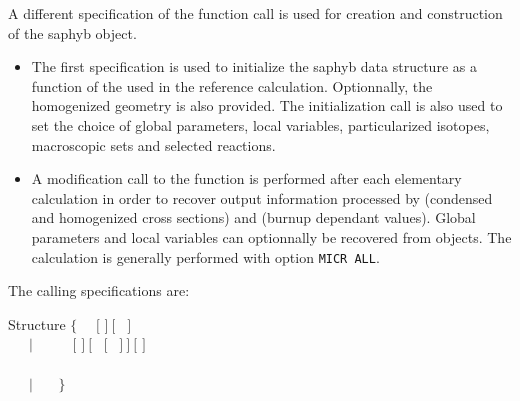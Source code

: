 A different specification of the  function call is used for
creation and construction of the {\sc saphyb} object.
\begin{itemize}
\item The first specification is used to initialize the {\sc saphyb} data structure
as a function of the  used in the reference calculation. Optionnally,
the homogenized geometry is also provided. The initialization call is also used to
set the choice of global parameters, local variables, particularized isotopes,
macroscopic sets and selected reactions.
\item A modification call to the  function is performed after each
elementary calculation in order to recover output information processed by 
(condensed and homogenized cross sections) and  (burnup dependant values).
Global parameters and local variables can optionnally be recovered from 
objects. The  calculation is generally performed with option {\tt MICR ALL}.
\end{itemize}

The calling specifications are:

\vskip -0.5cm

\begin{DataStructure}{Structure }
$\{$~~ \moc{:=}  $[$  $]~[$~ $]$ \moc{::}  \\
~~~$|$~~~ \moc{:=}  ~~$[$  $]~[$ ~$[$~ $]~]~[$  $]$\\
~~~~~~~~~~ \moc{::}  \\
~~~$|$~~~ \moc{:=}    \moc{::}  $\}$ \\
\end{DataStructure}

